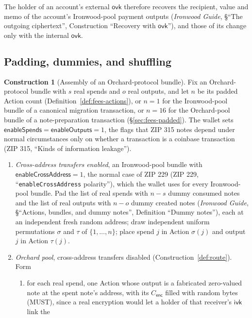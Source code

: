 \documentclass[11pt,a4paper]{article}
\theoremstyle{definition}
\newtheorem{construction}[theorem]{Construction}
\newcommand{\ivk}{\ensuremath{\mathsf{ivk}}}
\newcommand{\ovk}{\ensuremath{\mathsf{ovk}}}
\begin{document}
The holder of an account's external $\ovk$ therefore recovers the recipient,
value and memo of the account's Ironwood-pool payment outputs
(\emph{Ironwood Guide}, \S``The outgoing ciphertext'', Construction
``Recovery with $\ovk$''), and those of
its change only with the internal $\ovk$.

\subsection{Padding, dummies, and shuffling}\label{sec:pipeline-dummies}

\begin{construction}[Assembly of an Orchard-protocol bundle]
\label{def:dummy-assembly}
Fix an Orchard-protocol bundle with $s$ real spends and $o$ real outputs,
and let $n$ be its padded Action count (Definition~\ref{def:fees-actions}),
or $n = 1$ for the Ironwood-pool bundle of a canonical migration
transaction, or $n = 16$ for the Orchard-pool bundle of a note-preparation
transaction (\S\ref{sec:fees-padded}). The wallet sets
$\mathsf{enableSpends} = \mathsf{enableOutputs} = 1$, the flags that ZIP 315
notes depend under normal circumstances only on whether a transaction is a
coinbase transaction (ZIP 315, ``Kinds of information leakage'').
\begin{enumerate}[label=(\Alph*)]
\item \emph{Cross-address transfers enabled}, an Ironwood-pool bundle with
  $\mathsf{enableCrossAddress} = 1$, the normal case of ZIP 229 (ZIP 229,
  ``\texttt{enableCrossAddress} polarity''), which the wallet uses for
  every Ironwood-pool bundle. Pad the list of real spends with $n - s$
  dummy consumed notes and the list of real outputs with $n - o$ dummy
  created notes (\emph{Ironwood Guide}, \S``Actions, bundles, and dummy notes'',
  Definition ``Dummy notes''), each at an independent fresh random address; draw
  independent uniform permutations $\sigma$ and $\tau$ of $\{1, \dots, n\}$;
  place spend $j$ in Action $\sigma(j)$ and output $j$ in Action $\tau(j)$.
\item \emph{Orchard pool}, cross-address transfers disabled
  (Construction~\ref{def:route}). Form
  \begin{enumerate}[label=(\roman*)]
  \item for each real spend, one Action whose output is a fabricated
    zero-valued note at the spent note's address, with its
    $C_{\mathsf{enc}}$ filled with random bytes (MUST), since a real
    encryption would let a holder of that receiver's $\ivk$ link the

\end{enumerate}
\end{enumerate}
\end{construction}
\end{document}
